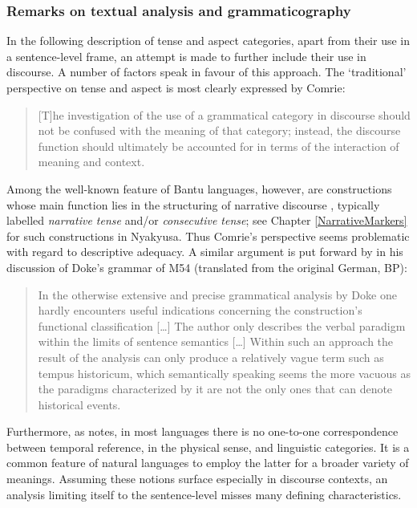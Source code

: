 \subsubsection{Remarks on textual analysis and grammaticography}
In the following description of tense and aspect categories, apart from their use in a sentence-level frame, an attempt is made to further include their use in discourse. A number of factors speak in favour of this approach. The \lq traditional' perspective on tense and aspect is most clearly expressed by Comrie:
\begin{quote}{[T]he investigation of the use of a grammatical category in discourse should not be confused with the meaning of that category; instead, the discourse function should ultimately be accounted for in terms of the interaction of meaning and context. \citep[29]{ComrieB1985}}\end{quote}

Among the well-known feature of Bantu languages, however, are constructions whose main function lies in the structuring of narrative discourse \citep[24]{NurseD2008}, typically labelled \textit{narrative tense} and/or \textit{consecutive tense}; see Chapter \ref{NarrativeMarkers} for such constructions in Nyakyusa. Thus Comrie's perspective seems problematic with regard to descriptive adequacy. A similar argument is put forward by \citet{GueldemannT1996} in his discussion of Doke's grammar of  M54 (translated from the original German, BP):
\begin{quote}{In the otherwise extensive and precise grammatical analysis by Doke one hardly encounters useful indications concerning the construction's functional classification […] The author only describes the verbal paradigm with\-in the limits of sentence semantics […] Within such an approach the result of the analysis can only produce a relatively vague term such as tempus historicum, which semantically speaking seems the more vacuous as the paradigms characterized by it are not the only ones that can denote historical events. \citep[208]{GueldemannT1996}}\end{quote}

Furthermore, as \citet[77ff]{LevinsonS1983} notes, in most languages there is no one-to-one correspondence between temporal reference, in the physical sense, and linguistic categories. It is a common feature of natural languages to employ the latter for a broader variety of meanings. Assuming these notions surface especially in discourse contexts, an analysis limiting itself to the sentence-level misses many defining characteristics.

